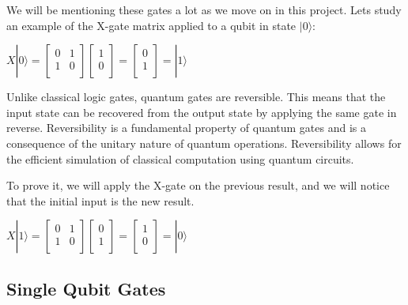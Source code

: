 \documentclass[inscr,ack,preface]{diphdthesis}
\begin{document}
We will be mentioning these gates a lot as we move on in this project.
Lets study an example of the X-gate matrix applied to a qubit in state $|0\rangle$:
\Large
\begin{center}
$X|0\rangle = \begin{bmatrix}
0 & 1 \\
1 & 0 \\
\end{bmatrix}
\begin{bmatrix}
1 \\
0 \\
\end{bmatrix} = 
\begin{bmatrix}
0 \\
1 \\
\end{bmatrix} = |1\rangle$

\end{center}
\normalsize

Unlike classical logic gates, quantum gates are reversible. This means that the input state can be recovered from the output state by applying the same gate in reverse. Reversibility is a fundamental property of quantum gates and is a consequence of the unitary nature of quantum operations. Reversibility allows for the efficient simulation of classical computation using quantum circuits.

To prove it, we will apply the X-gate on the previous result, and we will notice that the initial input is the new result.

\Large
\begin{center}
$X|1\rangle = \begin{bmatrix}
0 & 1 \\
1 & 0 \\
\end{bmatrix}
\begin{bmatrix}
0 \\
1 \\
\end{bmatrix} = 
\begin{bmatrix}
1 \\
0 \\
\end{bmatrix} = |0\rangle$

\end{center}
\normalsize

\subsection{Single Qubit Gates}
\end{document}

